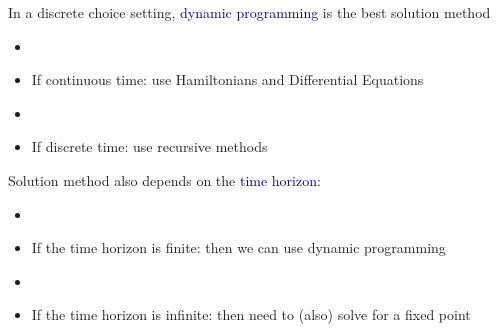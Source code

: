 \documentclass[aspectratio=169]{beamer}
\begin{document}
\begin{frame}

In a discrete choice setting, \textcolor{navy}{dynamic programming} is the best solution method

\bigskip{}


\begin{itemize}
\item[]
\item<3-> If continuous time: use Hamiltonians and Differential Equations
\item[]
\item<4-> If discrete time: use recursive methods
\end{itemize}
\end{frame}




\begin{frame}

Solution method also depends on the \textcolor{navy}{time horizon}:

\begin{itemize}
\item[]
\item<2-> If the time horizon is finite: then we can use dynamic programming
\item[]
\item<3-> If the time horizon is infinite: then need to (also) solve for a fixed point
\end{itemize}
\end{frame}
\end{document}
